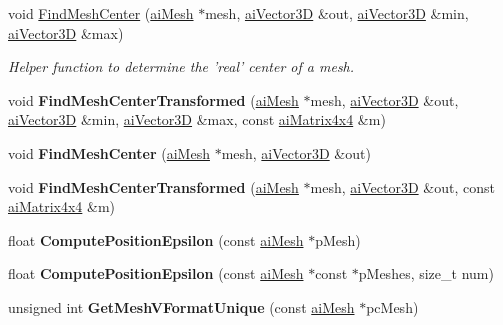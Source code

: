 \begin{DoxyCompactItemize}
void \hyperlink{namespace_assimp_a4cccef1c4b037b4eda69f9955fe614b4}{Find\+Mesh\+Center} (\hyperlink{structai_mesh}{ai\+Mesh} $\ast$mesh, \hyperlink{structai_vector3_d}{ai\+Vector3\+D} \&out, \hyperlink{structai_vector3_d}{ai\+Vector3\+D} \&min, \hyperlink{structai_vector3_d}{ai\+Vector3\+D} \&max)
\begin{DoxyCompactList}\small\item\em Helper function to determine the 'real' center of a mesh. \end{DoxyCompactList}\item 
\hypertarget{namespace_assimp_a11b3e8dea5deb3c5af6f2274b2ef6b64}{void {\bfseries Find\+Mesh\+Center\+Transformed} (\hyperlink{structai_mesh}{ai\+Mesh} $\ast$mesh, \hyperlink{structai_vector3_d}{ai\+Vector3\+D} \&out, \hyperlink{structai_vector3_d}{ai\+Vector3\+D} \&min, \hyperlink{structai_vector3_d}{ai\+Vector3\+D} \&max, const \hyperlink{structai_matrix4x4}{ai\+Matrix4x4} \&m)}\label{namespace_assimp_a11b3e8dea5deb3c5af6f2274b2ef6b64}

\item 
\hypertarget{namespace_assimp_a839a9cdc84f95933ad17a2d37893cecc}{void {\bfseries Find\+Mesh\+Center} (\hyperlink{structai_mesh}{ai\+Mesh} $\ast$mesh, \hyperlink{structai_vector3_d}{ai\+Vector3\+D} \&out)}\label{namespace_assimp_a839a9cdc84f95933ad17a2d37893cecc}

\item 
\hypertarget{namespace_assimp_a95a63d56d69ce397fe9df3798d6ef547}{void {\bfseries Find\+Mesh\+Center\+Transformed} (\hyperlink{structai_mesh}{ai\+Mesh} $\ast$mesh, \hyperlink{structai_vector3_d}{ai\+Vector3\+D} \&out, const \hyperlink{structai_matrix4x4}{ai\+Matrix4x4} \&m)}\label{namespace_assimp_a95a63d56d69ce397fe9df3798d6ef547}

\item 
\hypertarget{namespace_assimp_affb84e6645fc1086b1c603bac7e66247}{float {\bfseries Compute\+Position\+Epsilon} (const \hyperlink{structai_mesh}{ai\+Mesh} $\ast$p\+Mesh)}\label{namespace_assimp_affb84e6645fc1086b1c603bac7e66247}

\item 
\hypertarget{namespace_assimp_a3b45fa606f06463f34a84ee359b38737}{float {\bfseries Compute\+Position\+Epsilon} (const \hyperlink{structai_mesh}{ai\+Mesh} $\ast$const $\ast$p\+Meshes, size\+\_\+t num)}\label{namespace_assimp_a3b45fa606f06463f34a84ee359b38737}

\item 
\hypertarget{namespace_assimp_a878783b1070e56b553ae32b7ced01865}{unsigned int {\bfseries Get\+Mesh\+V\+Format\+Unique} (const \hyperlink{structai_mesh}{ai\+Mesh} $\ast$pc\+Mesh)}\label{namespace_assimp_a878783b1070e56b553ae32b7ced01865}


\end{DoxyCompactItemize}
